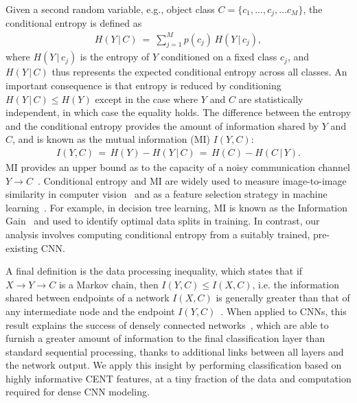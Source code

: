 \documentclass[10pt,onecolumn]{article}
\begin{document}
Given a second random variable, e.g., object class $C=\{c_1, \dots, c_j, \dots c_M\}$, the conditional entropy is defined as
\begin{align}
	H(Y\, | \,C) \ = \ \sum_{j=1}^M p(c_j) \, H(Y\, | \,c_j),
\end{align}
where $H(Y\, | \,c_j)$ is the entropy of $Y$ conditioned on a fixed class $c_j$, and $H(Y\, | \,C)$ thus represents the expected conditional entropy across all classes. An important consequence is that entropy is reduced by conditioning $H(Y\, | \,C) \le H(Y)$ except in the case where $Y$ and $C$ are statistically independent, in which case the equality holds. The difference between the entropy and the conditional entropy provides the amount of information shared by $Y$ and $C$, and is known as the mutual information (MI) $I(Y,C)$:
\begin{align}
	I(Y,C) \, = \, H(Y)-H(Y\, | \,C) \, = \, H(C)-H(C\, | \,Y).
\end{align}
MI provides an upper bound as to the capacity of a noisy communication channel $Y \rightarrow C$~\cite{cover2012elements}. Conditional entropy and MI are widely used to measure image-to-image similarity in computer vision~\cite{wells1996multi} and as a feature selection strategy in machine learning~\cite{brown2012conditional}. For example, in decision tree learning, MI is known as the Information Gain~\cite{duda2012pattern} and used to identify optimal data splits in training. In contrast, our analysis involves computing conditional entropy from a suitably trained, pre-existing CNN.

A final definition is the data processing inequality, which states that if $X \rightarrow Y \rightarrow C$ is a Markov chain, then $I(Y,C) \le I(X,C)$, i.e. the information shared between endpoints of a network $I(X,C)$ is generally greater than that of any intermediate node and the endpoint $I(Y,C)$~\cite{cover2012elements}. When applied to CNNs, this result explains the success of densely connected networks~\cite{huang2016densely}, which are able to furnish a greater amount of information to the final classification layer than standard sequential processing, thanks to additional links between all layers and the network output. We apply this insight by performing classification based on highly informative CENT features, at a tiny fraction of the data and computation required for dense CNN modeling. 

\end{document}
